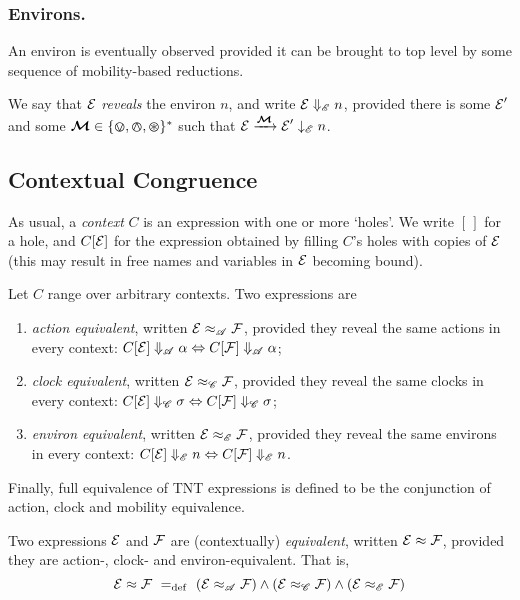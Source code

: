 \documentclass[orivec,envcountsame]{llncs}
\newcommand{\Exhibits}[1]{\mathrel{\downarrow_{#1}}}
\newcommand{\ExhibitsE}{\Exhibits{\mathscr{E}}}
\newcommand{\Reveals}[1]{\mathrel{\Downarrow_{#1}}}
\newcommand{\RevealsA}{\Reveals{\mathscr{A}}}
\newcommand{\RevealsC}{\Reveals{\mathscr{C}}}
\newcommand{\RevealsE}{\Reveals{\mathscr{E}}}
\newcommand{\Eq}{\approx}
\newcommand{\EqA}{\mathrel{\Eq_{\mathscr{A}}}}
\newcommand{\EqC}{\mathrel{\Eq_{\mathscr{C}}}}
\newcommand{\EqE}{\mathrel{\Eq_{\mathscr{E}}}}
\newcommand{\Means}{\mathrel{~=_{\mathrm{def}}~}}
\newcommand{\Does}[1]{\xderives{#1}}
\begin{document}
\subsubsection{Environs.}

An environ is eventually observed provided it can be brought to top level by some sequence of mobility-based reductions.

\begin{definition}
We say that $\text{$\mathcal{E}$}$ \emph{reveals} the environ $n$, and write $\expr \RevealsE n$, provided there is some $\text{$\mathcal{E}$}'$ and some $\vec{\ambop} \in \{\tin, \tout, \topen\}^*$ such that $\expr \Does{\vec{\ambop}} \expr' \ExhibitsE n$.
\end{definition}



\subsection{Contextual Congruence}
\label{sec:contextual-congruence}

As usual, a \emph{context} $C$ is an expression with one or more `holes'. We write $[\,]$ for a hole, and $C[\text{$\mathcal{E}$}]$ for the expression obtained by filling $C$'s holes with copies of $\text{$\mathcal{E}$}$ (this may result in free names and variables in $\text{$\mathcal{E}$}$ becoming bound).

\begin{definition}
Let $C$ range over arbitrary contexts. Two expressions are
\begin{enumerate}
\item
    \emph{action equivalent}, written $\expr \EqA \exprb$, provided they reveal the same actions in every context: $C[\expr] \RevealsA \alpha \Leftrightarrow C[\exprb] \RevealsA \alpha$;
\item
    \emph{clock equivalent}, written $\expr \EqC \exprb$, provided they reveal the same clocks in every context: $C[\expr] \RevealsC \sigma \Leftrightarrow C[\exprb] \RevealsC \sigma$;

\item
    \emph{environ equivalent}, written $\expr \EqE \exprb$, provided they reveal the same environs in every context: $C[\expr] \RevealsE n \Leftrightarrow C[\exprb] \RevealsE n$.
\end{enumerate}
\end{definition}

Finally, full equivalence of TNT expressions is defined to be the conjunction of action, clock and mobility equivalence.
\begin{definition}
Two expressions $\text{$\mathcal{E}$}$ and $\text{$\mathcal{F}$}$ are (contextually) \emph{equivalent}, written $\expr \Eq \exprb$, provided they are action-, clock- and environ-equivalent. That is,
\[
    \expr \Eq \exprb
    \Means
    \left( \expr \EqA \exprb \right)
    \land
    \left( \expr \EqC \exprb \right)
    \land 
    \left( \expr \EqE \exprb \right)
\]
\end{definition}
\end{document}
